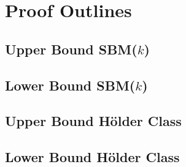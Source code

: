 \documentclass[11pt]{article}
\begin{document}
\section{Proof Outlines}\label{sec:proofs}

\subsection{Upper Bound SBM($k$)} \label{sec:upper_sbm}

\subsection{Lower Bound SBM($k$)} \label{sec:lower_sbm}

\subsection{Upper Bound H\"older Class} \label{sec:upper_hold}

\subsection{Lower Bound H\"older Class} \label{sec:lower_hold}



\end{document}
